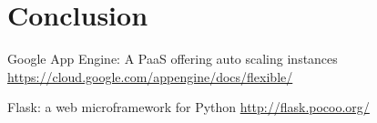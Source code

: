 \documentclass[conference]{IEEEtran}
\begin{document}
\section{Conclusion}

\begin{thebibliography}{00}
    Google App Engine: A PaaS offering auto scaling instances
    \url{https://cloud.google.com/appengine/docs/flexible/}

    Flask: a web microframework for Python
    \url{http://flask.pocoo.org/}
\end{thebibliography}
\end{document}
